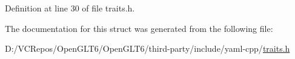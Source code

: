 Definition at line 30 of file traits.\+h.



The documentation for this struct was generated from the following file\+:\begin{DoxyCompactItemize}
\item 
D\+:/\+V\+C\+Repos/\+Open\+G\+L\+T6/\+Open\+G\+L\+T6/third-\/party/include/yaml-\/cpp/\mbox{\hyperlink{traits_8h}{traits.\+h}}\end{DoxyCompactItemize}
